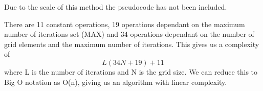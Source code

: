 \documentclass[aps,twocolumn,pre,nofootinbib,10pt]{revtex4-1}
\begin{document}

Due to the scale of this method the pseudocode has not been included. 

There are 11 constant operations, 19 operations dependant on the maximum number of iterations set (MAX) and 34 operations dependant on the number of grid elements and the maximum number of iterations. This gives us a complexity of \[L(34N+19)+11\] where L is the number of iterations and N is the grid size. We can reduce this to Big O notation as O(n), giving us an algorithm with linear complexity.
\end{document}
